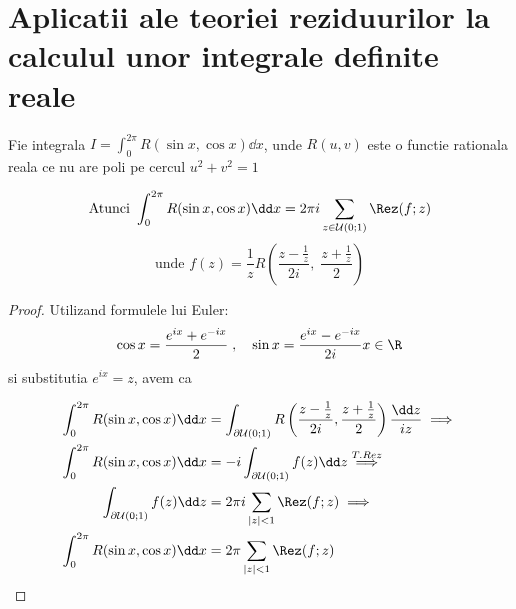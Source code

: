 \section{Aplicatii ale teoriei reziduurilor la calculul unor integrale definite reale}

\begin{tip}[1]
    Fie integrala $\displaystyle I=\int_{0}^{2\pi} R(\sin x, \cos x) \dd x$, unde
    $R(u,v)$ este o functie rationala reala ce nu are poli pe cercul $u^2+v^2=1$

    \[
        \text{Atunci } \int_{0}^{2\pi} R(\sin x , \cos x) \dd x =
        2\pi i \sum_{z\in \mathcal{U}(0;1)} \Rez(f;z)
    \]
    \[
        \text{unde } f(z) = \frac{1}{z} R\left(\frac{z-\frac{1}{z}}{2i},\; \frac{z+\frac{1}{z}}{2} \right)
    \]

    \begin{proof}
        Utilizand formulele lui Euler:
        \[
            \cos x = \frac{e^{ix}+e^{-ix}}{2}\; ,\quad \sin x = \frac{e^{ix}-e^{-ix}}{2i} x \in \R
        \]
        si substitutia $e^{ix}=z$, avem ca

        \begin{align*}
            \int_{0}^{2\pi} R(\sin x , \cos x) \dd x &=
                \int_{\partial \mathcal{U}(0;1)}
                    R\left(\frac{z-\frac{1}{z}}{2i}, \frac{z+\frac{1}{z}}{2} \right)
                \frac{\dd z}{iz}
            \implies
                        \\
                        \int_{0}^{2\pi} R(\sin x , \cos x) \dd x
                            &= -i \int_{\partial \mathcal{U}(0;1)} f(z) \dd z
            \overset{T.Rez}{\implies}
                        \\
                        \int_{\partial \mathcal{U}(0;1)} f(z) \dd z &=
                2\pi i \sum_{|z|<1} \Rez(f;z)
            \implies
                        \\
                        \int_{0}^{2\pi} R(\sin x , \cos x) \dd x &=
                2\pi \sum_{|z|<1} \Rez(f;z)
        \end{align*}


    \end{proof}
\end{tip}


